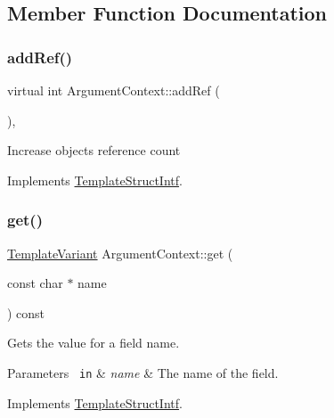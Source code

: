 \subsection{Member Function Documentation}
\mbox{\label{class_argument_context_ac494f4b56f0a590273034856f4e22728}} 
\subsubsection{\texorpdfstring{addRef()}{addRef()}}
{\footnotesize\ttfamily virtual int Argument\+Context\+::add\+Ref (\begin{DoxyParamCaption}{ }\end{DoxyParamCaption})\hspace{0.3cm}{\ttfamily [inline]}, {\ttfamily [virtual]}}

Increase object\textquotesingle{}s reference count 

Implements \mbox{\hyperlink{class_template_struct_intf_a05fe97ad47633beb326f69686faed581}{Template\+Struct\+Intf}}.

\mbox{\label{class_argument_context_a3114bb03f4b465f3b308d6157c393d22}} 
\subsubsection{\texorpdfstring{get()}{get()}}
{\footnotesize\ttfamily \mbox{\hyperlink{class_template_variant}{Template\+Variant}} Argument\+Context\+::get (\begin{DoxyParamCaption}\item[{const char $\ast$}]{name }\end{DoxyParamCaption}) const\hspace{0.3cm}{\ttfamily [virtual]}}

Gets the value for a field name. 
\begin{DoxyParams}[1]{Parameters}
\mbox{\texttt{ in}}  & {\em name} & The name of the field. \\
\hline
\end{DoxyParams}


Implements \mbox{\hyperlink{class_template_struct_intf_a3d610cb81b4adbb531ebed3aa3d09b51}{Template\+Struct\+Intf}}.


